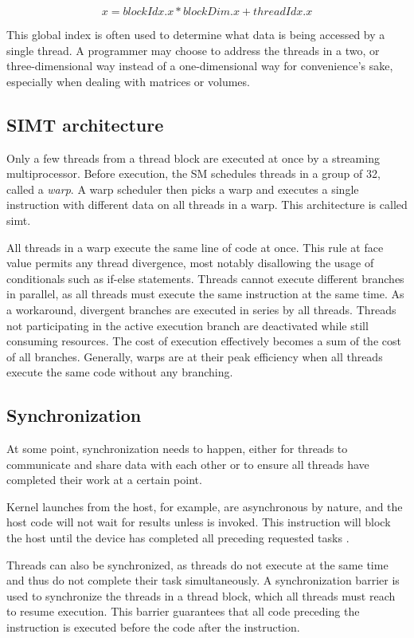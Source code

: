 $$x = blockIdx.x * blockDim.x + threadIdx.x$$

This global index is often used to determine what data is being accessed by a single thread. A programmer may choose to address the threads in a two, or three-dimensional way instead of a one-dimensional way for convenience's sake, especially when dealing with matrices or volumes.

\subsection{SIMT architecture}

Only a few threads from a thread block are executed at once by a streaming multiprocessor. Before execution, the SM schedules threads in a group of 32, called a \textit{warp}. A warp scheduler then picks a warp and executes a single instruction with different data on all threads in a warp. This architecture is called \acrfull{simt}.

All threads in a warp execute the same line of code at once. This rule at face value permits any thread divergence, most notably disallowing the usage of conditionals such as if-else statements. Threads cannot execute different branches in parallel, as all threads must execute the same instruction at the same time. As a workaround, divergent branches are executed in series by all threads. Threads not participating in the active execution branch are deactivated while still consuming resources. The cost of execution effectively becomes a sum of the cost of all branches. Generally, warps are at their peak efficiency when all threads execute the same code without any branching.

\subsection{Synchronization}

At some point, synchronization needs to happen, either for threads to communicate and share data with each other or to ensure all threads have completed their work at a certain point.

Kernel launches from the host, for example, are asynchronous by nature, and the host code will not wait for results unless  is invoked. This instruction will block the host until the device has completed all preceding requested tasks \cite{cudaprog}.

Threads can also be synchronized, as threads do not execute at the same time and thus do not complete their task simultaneously. A synchronization barrier  is used to synchronize the threads in a thread block, which all threads must reach to resume execution. This barrier guarantees that all code preceding the instruction is executed before the code after the instruction.

